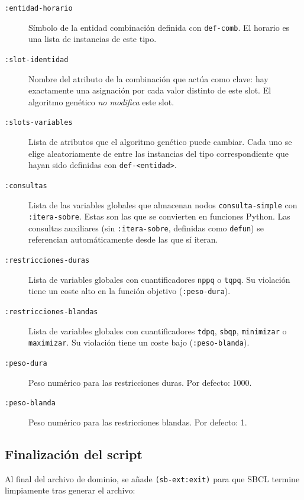 \documentclass[12pt,a4paper]{article}
\newcommand{\code}[1]{\texttt{#1}}
\begin{document}
\begin{description}
  \item[\code{:entidad-horario}] Símbolo de la entidad combinación definida
    con \code{def-comb}. El horario es una lista de instancias de este tipo.

  \item[\code{:slot-identidad}] Nombre del atributo de la combinación que
    actúa como clave: hay exactamente una asignación por cada valor distinto
    de este slot. El algoritmo genético \textit{no modifica} este slot.

  \item[\code{:slots-variables}] Lista de atributos que el algoritmo
    genético puede cambiar. Cada uno se elige aleatoriamente de entre las
    instancias del tipo correspondiente que hayan sido definidas con
    \code{def-<entidad>}.

  \item[\code{:consultas}] Lista de las variables globales que almacenan
    nodos \code{consulta-simple} con \code{:itera-sobre}. Estas son las
    que se convierten en funciones Python. Las consultas auxiliares (sin
    \code{:itera-sobre}, definidas como \code{defun}) se referencian
    automáticamente desde las que sí iteran.

  \item[\code{:restricciones-duras}] Lista de variables globales con
    cuantificadores \code{nppq} o \code{tqpq}. Su violación tiene un
    coste alto en la función objetivo (\code{:peso-dura}).

  \item[\code{:restricciones-blandas}] Lista de variables globales con
    cuantificadores \code{tdpq}, \code{sbqp}, \code{minimizar} o
    \code{maximizar}. Su violación tiene un coste bajo (\code{:peso-blanda}).

  \item[\code{:peso-dura}] Peso numérico para las restricciones duras.
    Por defecto: 1000.

  \item[\code{:peso-blanda}] Peso numérico para las restricciones blandas.
    Por defecto: 1.
\end{description}

\subsection{Finalización del script}

Al final del archivo de dominio, se añade \code{(sb-ext:exit)} para que
SBCL termine limpiamente tras generar el archivo:
\end{document}
